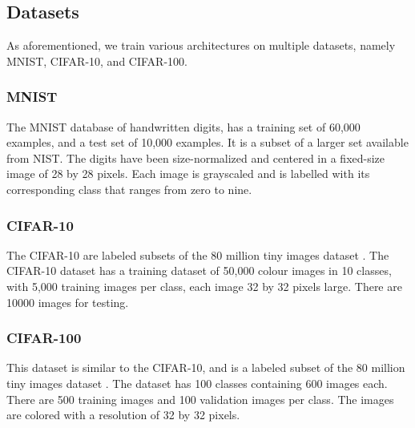 \subsection{Datasets}
As aforementioned, we train various architectures on multiple datasets, namely MNIST, CIFAR-10, and CIFAR-100. 
\newline
\subsubsection{MNIST}
The MNIST database \cite{lecun-mnisthandwrittendigit-2010} of handwritten digits, has a training set of 60,000 examples, and a test set of 10,000 examples. It is a subset of a larger set available from NIST. The digits have been size-normalized and centered in a fixed-size image of 28 by 28 pixels. Each image is grayscaled and is labelled with its corresponding class that ranges from zero to nine.

\newline
\subsubsection{CIFAR-10}
The CIFAR-10 are labeled subsets of the 80 million tiny images dataset \cite{Torralba:2008:MTI:1444381.1444403}. The CIFAR-10 dataset has a training dataset of 50,000 colour images in 10 classes, with 5,000 training images per class, each image 32 by 32 pixels large. There are 10000 images for testing. 
\newline
\subsubsection{CIFAR-100}
This dataset is similar to the CIFAR-10, and is a labeled subset of the 80 million tiny images dataset \cite{Torralba:2008:MTI:1444381.1444403}. The dataset has 100 classes containing 600 images each. There are 500 training images and 100 validation images per class. The images are colored with a resolution of 32 by 32 pixels.
